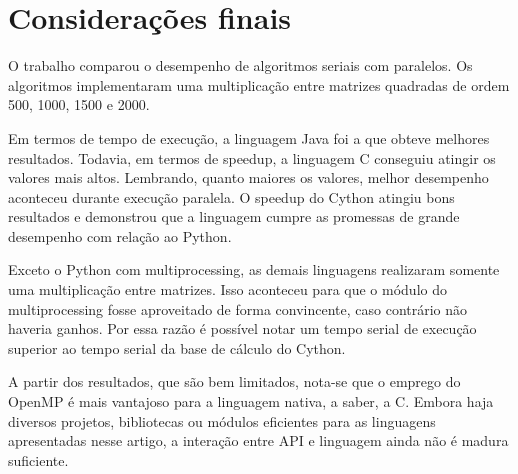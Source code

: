 \documentclass[a4paper,12pt]{article}
\begin{document}
\section{Considerações finais}
O trabalho comparou o desempenho de algoritmos seriais com paralelos. Os algoritmos implementaram uma multiplicação entre matrizes quadradas de ordem 500, 1000, 1500 e 2000. 

Em termos de tempo de execução, a linguagem Java foi a que obteve melhores resultados. Todavia, em termos de speedup, a linguagem C conseguiu atingir os valores mais altos. Lembrando, quanto maiores os valores, melhor desempenho aconteceu durante execução paralela. O speedup do Cython atingiu bons resultados e demonstrou que a linguagem cumpre as promessas de grande desempenho com relação ao Python. 

Exceto o Python com multiprocessing, as demais linguagens realizaram somente uma multiplicação entre matrizes. Isso aconteceu para que o módulo do multiprocessing fosse aproveitado de forma convincente, caso contrário não haveria ganhos. Por essa razão é possível notar um tempo serial de execução superior ao tempo serial da base de cálculo do Cython.

A partir dos resultados, que são bem limitados, nota-se que o emprego do OpenMP é mais vantajoso para a linguagem nativa, a saber, a C. Embora haja diversos projetos, bibliotecas ou módulos eficientes para as linguagens apresentadas nesse artigo, a interação entre API e linguagem ainda não é madura suficiente.  




\end{document}
